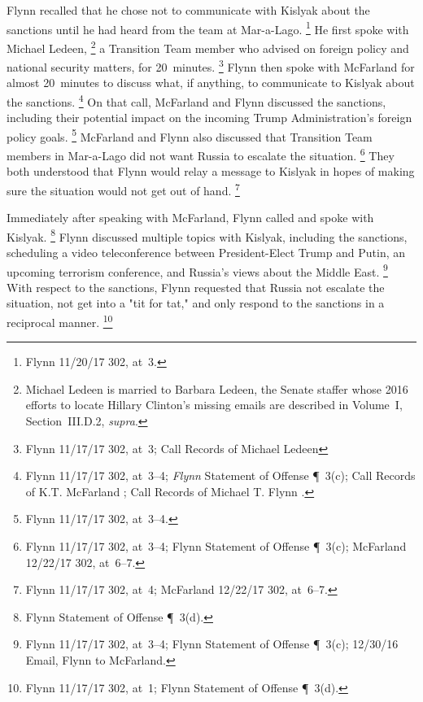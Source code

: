 Flynn recalled that he chose not to communicate with Kislyak about the sanctions until he had heard from the team at Mar-a-Lago.%
\footnote{Flynn 11/20/17 302, at~3.}
He first spoke with Michael Ledeen,%
\footnote{Michael Ledeen is married to Barbara Ledeen, the Senate staffer whose 2016 efforts to locate Hillary Clinton's missing emails are described in Volume~I, Section~III.D.2, \textit{supra}.}
a Transition Team member who advised on foreign policy and national security matters, for 20~minutes.%
\footnote{Flynn 11/17/17 302, at~3;
Call Records of Michael Ledeen }
Flynn then spoke with McFarland for almost 20~minutes to discuss what, if anything, to communicate to Kislyak about the sanctions.%
\footnote{Flynn 11/17/17 302, at~3--4;
\textit{Flynn} Statement of Offense \P~3(c);
Call Records of K.T. McFarland ;
Call Records of Michael T. Flynn .
}
On that call, McFarland and Flynn discussed the sanctions, including their potential impact on the incoming Trump Administration's foreign policy goals.%
\footnote{Flynn 11/17/17 302, at~3--4.}
McFarland and Flynn also discussed that Transition Team members in Mar-a-Lago did not want Russia to escalate the situation.%
\footnote{Flynn 11/17/17 302, at~3--4;
Flynn Statement of Offense \P~3(c);
McFarland 12/22/17 302, at~6--7.}
They both understood that Flynn would relay a message to Kislyak in hopes of making sure the situation would not get out of hand.%
\footnote{Flynn 11/17/17 302, at~4;
McFarland 12/22/17 302, at~6--7.}

Immediately after speaking with McFarland, Flynn called and spoke with Kislyak.%
\footnote{Flynn Statement of Offense \P~3(d).}
Flynn discussed multiple topics with Kislyak, including the sanctions, scheduling a video teleconference between President-Elect Trump and Putin, an upcoming terrorism conference, and Russia's views about the Middle East.%
\footnote{Flynn 11/17/17 302, at~3--4;
Flynn Statement of Offense \P~3(c);
12/30/16 Email, Flynn to McFarland.}
With respect to the sanctions, Flynn requested that Russia not escalate the situation, not get into a "tit for tat," and only respond to the sanctions in a reciprocal manner.%
\footnote{Flynn 11/17/17 302, at~1;
Flynn Statement of Offense \P~3(d).}

